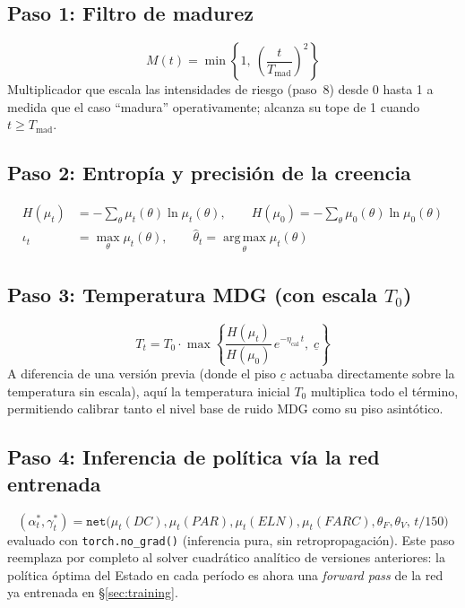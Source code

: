\documentclass[ecta,nameyear,draft]{econsocart}
\newcommand{\pyvar}[1]{\texttt{#1}}
\begin{document}
\subsection{Paso 1: Filtro de madurez}

\begin{equation}
M(t) = \min\left\{1,\ \left(\frac{t}{T_{\mathrm{mad}}}\right)^2\right\}
\end{equation}
Multiplicador que escala las intensidades de riesgo (paso~8) desde 0 hasta 1 a medida que el
caso ``madura'' operativamente; alcanza su tope de 1 cuando $t \geq T_{\mathrm{mad}}$.

\subsection{Paso 2: Entropía y precisión de la creencia}

\begin{align}
H(\mu_t) &= -\sum_\theta \mu_t(\theta)\ln\mu_t(\theta), \qquad
H(\mu_0) = -\sum_\theta \mu_0(\theta)\ln\mu_0(\theta) \\
\iota_t &= \max_\theta \mu_t(\theta), \qquad \hat{\theta}_t = \operatorname*{arg\,max}_\theta \mu_t(\theta)
\end{align}

\subsection{Paso 3: Temperatura MDG (con escala $T_0$)}

\begin{equation}
T_t = T_0 \cdot \max\left\{ \frac{H(\mu_t)}{H(\mu_0)}\, e^{-\eta_{\mathrm{cal}}\, t},\; \underline{c} \right\}
\end{equation}
A diferencia de una versión previa (donde el piso $\underline{c}$ actuaba directamente sobre
la temperatura sin escala), aquí la temperatura inicial $T_0$ multiplica todo el término,
permitiendo calibrar tanto el nivel base de ruido MDG como su piso asintótico.

\subsection{Paso 4: Inferencia de política vía la red entrenada}

\begin{equation}
(\alpha_t^\ast, \gamma_t^\ast) = \pyvar{net}\bigl(\mu_t(DC),\mu_t(PAR),\mu_t(ELN),\mu_t(FARC),\theta_F,\theta_V,\, t/150\bigr)
\end{equation}
evaluado con \pyvar{torch.no\_grad()} (inferencia pura, sin retropropagación). Este paso
reemplaza por completo al solver cuadrático analítico de versiones anteriores: la política
óptima del Estado en cada período es ahora una \emph{forward pass} de la red ya entrenada en
\S\ref{sec:training}.
\end{document}
